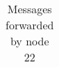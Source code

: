 \documentclass{article}
\begin{document}
\begin{table}[H]
\begin{center}
\begin{tabular}{|c|c|c|c|c|c|c|c|c|c|c|}
			    \end{tabular}
			\end{center}	
			\caption{Messages forwarded by node 22}
			\label{tab:25F22}
		\end{table}		
		
\end{document}

